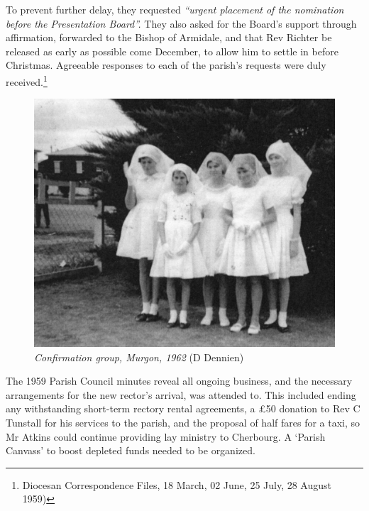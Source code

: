 To prevent further delay, they requested \emph{``urgent placement of the nomination before the Presentation Board''.} They also asked for the Board's support through affirmation, forwarded to the Bishop of Armidale, and that Rev Richter be released as early as possible come December, to allow him to settle in before Christmas. Agreeable responses to each of the parish's requests were duly received.\footnote{Diocesan Correspondence Files, 18 March, 02 June, 25 July, 28 August 1959)}








\begin{figure}
\begin{center}
\includegraphics[width=1.\linewidth,center]{../images/confirmation1962.jpg}
\caption{{\itshape Confirmation group, Murgon, 1962} {\scriptsize(D Dennien)}}
\end{center}
\end{figure}




The 1959 Parish Council minutes reveal all ongoing business, and the necessary arrangements for the new rector's arrival, was attended to. This included ending any withstanding short-term rectory rental agreements, a \pounds50 donation to Rev C Tunstall for his services to the parish, and the proposal of half fares for a taxi, so Mr Atkins could continue providing lay ministry to Cherbourg. A `Parish Canvass' to boost depleted funds needed to be organized.



